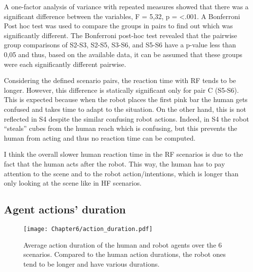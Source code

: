 A one-factor analysis of variance with repeated measures showed that there was a significant difference between the variables, F = 5,32, p = <.001.
A Bonferroni Post hoc test was used to compare the groups in pairs to find out which was significantly different.
The Bonferroni post-hoc test revealed that the pairwise group comparisons of S2-S3, S2-S5, S3-S6, and S5-S6 have a p-value less than 0,05 and thus, based on the available data, it can be assumed that these groups were each significantly different pairwise. 

Considering the defined scenario pairs, the reaction time with RF tends to be longer. However, this difference is statically significant only for pair C (S5-S6). This is expected because when the robot places the first pink bar the human gets confused and takes time to adapt to the situation. On the other hand, this is not reflected in S4 despite the similar confusing robot actions. Indeed, in S4 the robot ``steals'' cubes from the human reach which is confusing, but this prevents the human from acting and thus no reaction time can be computed.  

I think the overall slower human reaction time in the RF scenarios is due to the fact that the human acts after the robot. This way, the human has to pay attention to the scene and to the robot action/intentions, which is longer than only looking at the scene like in HF scenarios.   


\subsection*{Agent actions' duration}

\begin{figure}[h]
    \center
    \texttt{[image: Chapter6/action\_duration.pdf]}
    \caption{Average action duration of the human and robot agents over the 6 scenarios. Compared to the human action durations, the robot ones tend to be longer and have various durations.}
    \label{fig:action_durations}
\end{figure}


